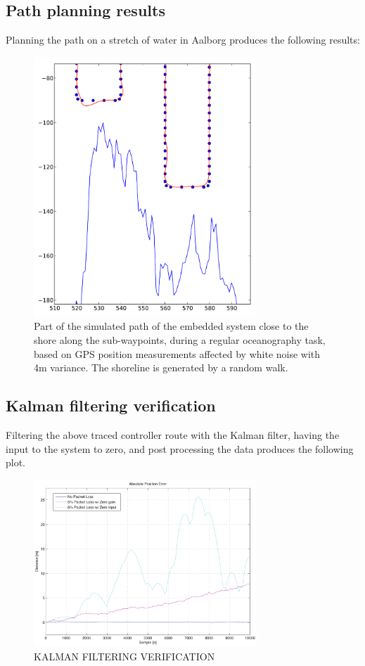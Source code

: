 \documentclass{ifacconf}
\begin{document}
\subsection{Path planning results}
Planning the path on a stretch of water in Aalborg produces the following results:
\begin{figure}
	\begin{center}
		\includegraphics[width=8.4cm]{img/Navi}    %
		\caption{Part of the simulated path of the embedded system close to the shore along the sub-waypoints, during a regular oceanography task, based on GPS position measurements affected by white noise with 4m variance. The shoreline is generated by a random walk.}  %
		\label{fig:navi}               
	\end{center}                                 %
\end{figure}

\subsection{Kalman filtering verification}
Filtering the above traced controller route with the Kalman filter, having the input to the system to zero, and post processing the data produces the following plot.
\begin{figure}
	\begin{center}
		\includegraphics[width=8.4cm]{img/abspos}    %
		\caption{KALMAN FILTERING VERIFICATION}  %
		\label{fig:3points}               
	\end{center}                                 %
\end{figure}
\end{document}
